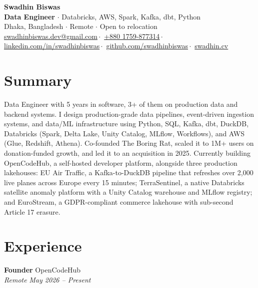 \documentclass[10.5pt,letterpaper]{article}
\newcommand{\role}[4]{%
  \textbf{#1} \hfill #2 \\
  \textit{#3} \hfill \textit{#4}%
}
\begin{document}
\begin{center}
  {\Large \textbf{Swadhin Biswas}}\\[2pt]
  \small \textbf{Data Engineer} $\cdot$ Databricks, AWS, Spark, Kafka, dbt, Python\\[3pt]
  Dhaka, Bangladesh $\cdot$ Remote $\cdot$ Open to relocation\\[3pt]
  \href{mailto:swadhinbiswas.dev@gmail.com}{swadhinbiswas.dev@gmail.com}\,$\cdot$\,
  \href{tel:+8801759877314}{+880 1759-877314}\,$\cdot$\,
  \href{https://www.linkedin.com/in/swadhinbiswas/}{linkedin.com/in/swadhinbiswas}\,$\cdot$\,
  \href{https://github.com/swadhinbiswas}{github.com/swadhinbiswas}\,$\cdot$\,
  \href{https://swadhin.cv}{swadhin.cv}
\end{center}
\vspace{1pt}

\section*{Summary}
Data Engineer with 5 years in software, 3+ of them on production data and backend systems. I design production-grade data pipelines, event-driven ingestion systems, and data/ML infrastructure using Python, SQL, Kafka, dbt, DuckDB, Databricks (Spark, Delta Lake, Unity Catalog, MLflow, Workflows), and AWS (Glue, Redshift, Athena). Co-founded The Boring Rat, scaled it to 1M+ users on donation-funded growth, and led it to an acquisition in 2025. Currently building OpenCodeHub, a self-hosted developer platform, alongside three production lakehouses: EU Air Traffic, a Kafka-to-DuckDB pipeline that refreshes over 2,000 live planes across Europe every 15 minutes; TerraSentinel, a native Databricks satellite anomaly platform with a Unity Catalog warehouse and MLflow registry; and EuroStream, a GDPR-compliant commerce lakehouse with sub-second Article 17 erasure.


\section*{Experience}
\role{Founder}{OpenCodeHub}{Remote}{May 2026 -- Present}
\end{document}
